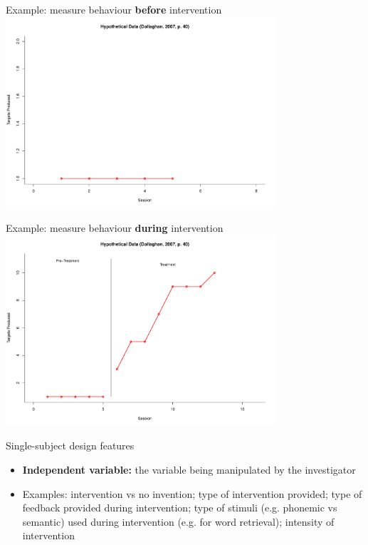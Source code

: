 \documentclass{beamer}
\begin{document}
% 
\begin{frame}{Example: measure behaviour \textbf{before} intervention}
	\includegraphics[width=10cm]{SSD/Aplot.pdf}
\end{frame}

% 
\begin{frame}{Example: measure behaviour \textbf{during} intervention}
	\includegraphics[width=10cm]{SSD/ABplot.pdf}
\end{frame}

% 
\begin{frame}{Single-subject design features}
	\begin{itemize}
	\item \textbf{Independent variable:} the variable being manipulated by the investigator
	\item Examples: intervention vs no invention; type of intervention provided; type of feedback provided during intervention; type of stimuli (e.g. phonemic vs semantic) used during intervention (e.g. for word retrieval); intensity of intervention
	\end{itemize}
\end{frame}
\end{document}
